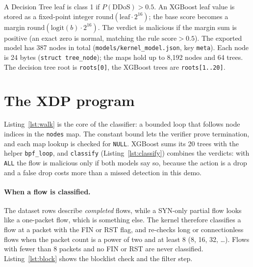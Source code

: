 A Decision Tree leaf is class 1 if $P(\mathrm{DDoS})>0.5$. An XGBoost leaf value is stored as a fixed-point integer $\mathrm{round}(\mathrm{leaf}\cdot 2^{16})$; the base score becomes a margin $\mathrm{round}(\mathrm{logit}(b)\cdot 2^{16})$. The verdict is malicious if the margin sum is positive (an exact zero is normal, matching the rule $\mathrm{score}>0.5$). The exported model has 387 nodes in total (\texttt{models/kernel\_model.json}, key \texttt{meta}). Each node is 24 bytes (\texttt{struct tree\_node}); the maps hold up to 8,192 nodes and 64 trees. The decision tree root is \texttt{roots[0]}, the XGBoost trees are \texttt{roots[1..20]}.

\section{The XDP program}\label{sec:xdp}
Listing~\ref{lst:walk} is the core of the classifier: a bounded loop that follows node indices in the \texttt{nodes} map. The constant bound lets the verifier prove termination, and each map lookup is checked for \texttt{NULL}. XGBoost sums its 20 trees with the helper \texttt{bpf\_loop}, and \texttt{classify} (Listing~\ref{lst:classify}) combines the verdicts: with \texttt{ALL} the flow is malicious only if both models say so, because the action is a drop and a false drop costs more than a missed detection in this demo.




\paragraph{When a flow is classified.} The dataset rows describe \emph{completed} flows, while a SYN-only partial flow looks like a one-packet flow, which is something else. The kernel therefore classifies a flow at a packet with the FIN or RST flag, and re-checks long or connectionless flows when the packet count is a power of two and at least 8 (8, 16, 32, \ldots). Flows with fewer than 8 packets and no FIN or RST are never classified. Listing~\ref{lst:block} shows the blocklist check and the filter step.




